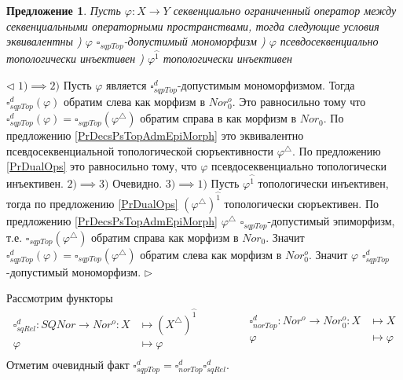 \documentclass[12pt]{article}
\newtheorem{proposition}[theorem]{Предложение}
\newenvironment{proof}{\par $\triangleleft$}{$\triangleright$}
\begin{document}
\begin{proposition}\label{PrDecsPsTopAdmMonoMorph}
Пусть $\varphi:X\to Y$ секвенциально ограниченный оператор между секвенциальными операторными пространствами, тогда следующие условия эквивалентны
) $\varphi$ $\square_{sqpTop}$-допустимый мономорфизм
) $\varphi$ псевдосеквенциально топологически инъективен
) $\varphi^{\wideparen{1}}$ топологически инъективен 
\end{proposition}
\begin{proof}
$1)\implies 2)$ Пусть $\varphi$ является $\square_{sqpTop}^d$-допустимым мономорфизмом. Тогда $\square_{sqpTop}^d(\varphi)$ обратим слева как морфизм в $Nor_0^o$. Это равносильно тому что 
$\square_{sqpTop}^d(\varphi)=\square_{sqpTop}(\varphi^\triangle)$ обратим справа в как морфизм в $Nor_0$. По предложению \ref{PrDecsPsTopAdmEpiMorph} это эквивалентно псевдосеквенциальной топологической сюръективности $\varphi^\triangle$. 
По предложению \ref{PrDualOps} это равносильно тому, что $\varphi$ псевдосеквенциально топологически инъективен.
\newline
$2)\implies 3)$ Очевидно.
\newline
$3)\implies 1)$ Пусть $\varphi^{\wideparen{1}}$ топологически инъективен, тогда по предложению \ref{PrDualOps} $(\varphi^\triangle)^{\wideparen{1}}$ топологически сюръективен. По предложению \ref{PrDecsPsTopAdmEpiMorph} $\varphi^\triangle$ $\square_{sqpTop}$-допустимый эпиморфизм, т.е. $\square_{sqpTop}(\varphi^\triangle)$ обратим справа как морфизм в $Nor_0$. Значит $\square_{sqpTop}^d(\varphi)=\square_{sqpTop}(\varphi^\triangle)$ обратим слева как морфизм в $Nor_0^o$. Значит $\varphi$ $\square_{sqpTop}^d$-допустимый мономорфизм. 
\end{proof}

Рассмотрим функторы
$$
\begin{aligned}
\square_{sqRel}^d : SQNor \to Nor^o: X &\mapsto (X^\triangle)^{\wideparen{1}}\\
\varphi&\mapsto\varphi\\
\end{aligned}
\qquad\qquad
\begin{aligned}
\square_{norTop}^d : Nor^o \to Nor_0^o: X &\mapsto X\\
\varphi&\mapsto\varphi\\
\end{aligned}
$$
Отметим очевидный факт $\square_{sqpTop}^d=\square_{norTop}^d\square_{sqRel}^d$.
\end{document}

